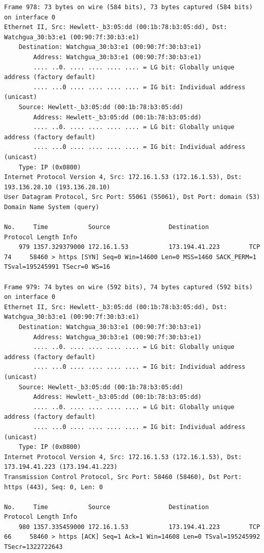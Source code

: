 \documentclass[a4paper,11pt]{article}
\begin{document}
\begin{lstlisting}
Frame 978: 73 bytes on wire (584 bits), 73 bytes captured (584 bits) on interface 0
Ethernet II, Src: Hewlett-_b3:05:dd (00:1b:78:b3:05:dd), Dst: Watchgua_30:b3:e1 (00:90:7f:30:b3:e1)
    Destination: Watchgua_30:b3:e1 (00:90:7f:30:b3:e1)
        Address: Watchgua_30:b3:e1 (00:90:7f:30:b3:e1)
        .... ..0. .... .... .... .... = LG bit: Globally unique address (factory default)
        .... ...0 .... .... .... .... = IG bit: Individual address (unicast)
    Source: Hewlett-_b3:05:dd (00:1b:78:b3:05:dd)
        Address: Hewlett-_b3:05:dd (00:1b:78:b3:05:dd)
        .... ..0. .... .... .... .... = LG bit: Globally unique address (factory default)
        .... ...0 .... .... .... .... = IG bit: Individual address (unicast)
    Type: IP (0x0800)
Internet Protocol Version 4, Src: 172.16.1.53 (172.16.1.53), Dst: 193.136.28.10 (193.136.28.10)
User Datagram Protocol, Src Port: 55061 (55061), Dst Port: domain (53)
Domain Name System (query)

No.     Time           Source                Destination           Protocol Length Info
    979 1357.329379000 172.16.1.53           173.194.41.223        TCP      74     58460 > https [SYN] Seq=0 Win=14600 Len=0 MSS=1460 SACK_PERM=1 TSval=195245991 TSecr=0 WS=16

Frame 979: 74 bytes on wire (592 bits), 74 bytes captured (592 bits) on interface 0
Ethernet II, Src: Hewlett-_b3:05:dd (00:1b:78:b3:05:dd), Dst: Watchgua_30:b3:e1 (00:90:7f:30:b3:e1)
    Destination: Watchgua_30:b3:e1 (00:90:7f:30:b3:e1)
        Address: Watchgua_30:b3:e1 (00:90:7f:30:b3:e1)
        .... ..0. .... .... .... .... = LG bit: Globally unique address (factory default)
        .... ...0 .... .... .... .... = IG bit: Individual address (unicast)
    Source: Hewlett-_b3:05:dd (00:1b:78:b3:05:dd)
        Address: Hewlett-_b3:05:dd (00:1b:78:b3:05:dd)
        .... ..0. .... .... .... .... = LG bit: Globally unique address (factory default)
        .... ...0 .... .... .... .... = IG bit: Individual address (unicast)
    Type: IP (0x0800)
Internet Protocol Version 4, Src: 172.16.1.53 (172.16.1.53), Dst: 173.194.41.223 (173.194.41.223)
Transmission Control Protocol, Src Port: 58460 (58460), Dst Port: https (443), Seq: 0, Len: 0

No.     Time           Source                Destination           Protocol Length Info
    980 1357.335459000 172.16.1.53           173.194.41.223        TCP      66     58460 > https [ACK] Seq=1 Ack=1 Win=14608 Len=0 TSval=195245992 TSecr=1322722643


\end{lstlisting}
\end{document}
